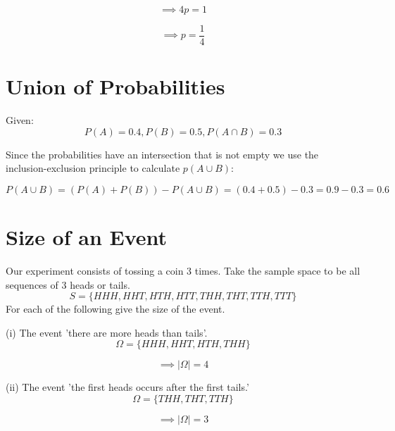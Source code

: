 \documentclass[a4paper,11pt]{article}
\begin{document}
\begin{equation}
\implies 4p = 1
\end{equation}

\begin{equation}
\implies p = \frac{1}{4}
\end{equation}

\section{Union of Probabilities}
Given:
\begin{equation}
P\left(A\right)=0.4,
P\left(B\right)=0.5,
P\left(A \cap B \right)=0.3
\end{equation}

Since the probabilities have an intersection that is not empty we use
the inclusion-exclusion principle to calculate $p\left(A \cup B\right)$:

\begin{equation}
P\left( A \cup B \right) 
= \left( P\left( A \right) + P\left( B \right) \right) - P\left( A \cup B \right)
= (0.4 + 0.5) - 0.3 = 0.9 - 0.3 = 0.6
\end{equation}

\section{Size of an Event}
Our experiment consists of tossing a coin 3 times. Take the sample space
to be all sequences of 3 heads or tails.
\begin{equation}
S = \{HHH, HHT, HTH, HTT, THH, THT, TTH, TTT\}
\end{equation}
For each of the following give the size of the event.

(i) The event 'there are more heads than tails'.
\begin{equation}
\Omega = \{HHH, HHT, HTH, THH\}
\end{equation}

\begin{equation}
\implies |\Omega| = 4
\end{equation}

(ii) The event 'the first heads occurs after the first tails.'
\begin{equation}
\Omega = \{ THH, THT, TTH\}
\end{equation}

\begin{equation}
\implies |\Omega| = 3
\end{equation}
\end{document}
